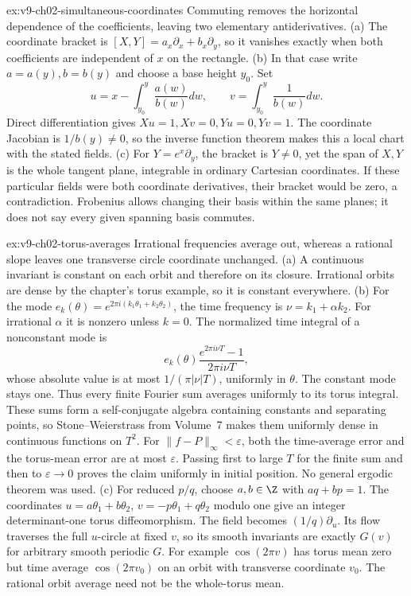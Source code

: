 \begin{solution}{ex:v9-ch02-simultaneous-coordinates}
\idea Commuting removes the horizontal dependence of the coefficients, leaving two elementary antiderivatives.
\writeup (a) The coordinate bracket is $[X,Y]=a_x\partial_x+b_x\partial_y$, so it vanishes exactly when both coefficients are independent of $x$ on the rectangle.
(b) In that case write $a=a(y),b=b(y)$ and choose a base height $y_0$. Set
\[
u=x-\int_{y_0}^y\frac{a(w)}{b(w)}dw,\qquad
v=\int_{y_0}^y\frac1{b(w)}dw.
\]
Direct differentiation gives $Xu=1,Xv=0,Yu=0,Yv=1$. The coordinate Jacobian is $1/b(y)\ne0$, so the inverse function theorem makes this a local chart with the stated fields.
(c) For $Y=e^x\partial_y$, the bracket is $Y\ne0$, yet the span of $X,Y$ is the whole tangent plane, integrable in ordinary Cartesian coordinates. If these particular fields were both coordinate derivatives, their bracket would be zero, a contradiction. Frobenius allows changing their basis within the same planes; it does not say every given spanning basis commutes.
\end{solution}

\begin{solution}{ex:v9-ch02-torus-averages}
\idea Irrational frequencies average out, whereas a rational slope leaves one transverse circle coordinate unchanged.
\writeup (a) A continuous invariant is constant on each orbit and therefore on its closure. Irrational orbits are dense by the chapter's torus example, so it is constant everywhere.
(b) For the mode $e_k(\theta)=e^{2\pi i(k_1\theta_1+k_2\theta_2)}$, the time frequency is $\nu=k_1+\alpha k_2$. For irrational $\alpha$ it is nonzero unless $k=0$. The normalized time integral of a nonconstant mode is
\[
e_k(\theta)\frac{e^{2\pi i\nu T}-1}{2\pi i\nu T},
\]
whose absolute value is at most $1/(\pi|\nu|T)$, uniformly in $\theta$. The constant mode stays one. Thus every finite Fourier sum averages uniformly to its torus integral. These sums form a self-conjugate algebra containing constants and separating points, so Stone--Weierstrass from Volume~7 makes them uniformly dense in continuous functions on $T^2$. For $\|f-P\|_\infty<\varepsilon$, both the time-average error and the torus-mean error are at most $\varepsilon$. Passing first to large $T$ for the finite sum and then to $\varepsilon\to0$ proves the claim uniformly in initial position. No general ergodic theorem was used.
(c) For reduced $p/q$, choose $a,b\in\Z$ with $aq+bp=1$. The coordinates
$u=a\theta_1+b\theta_2$, $v=-p\theta_1+q\theta_2$ modulo one give an integer determinant-one torus diffeomorphism. The field becomes $(1/q)\partial_u$. Its flow traverses the full $u$-circle at fixed $v$, so its smooth invariants are exactly $G(v)$ for arbitrary smooth periodic $G$. For example $\cos(2\pi v)$ has torus mean zero but time average $\cos(2\pi v_0)$ on an orbit with transverse coordinate $v_0$. The rational orbit average need not be the whole-torus mean.
\end{solution}

